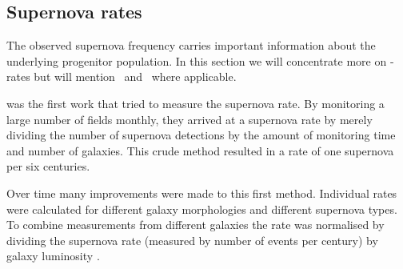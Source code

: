 \subsection{Supernova rates}
\label{sec:sn_rates}
The observed supernova frequency carries important information about the underlying progenitor population. In this section we will concentrate more on \sneia-rates but will mention \sneii\ and \sneibc\ where applicable.

\citet{1938ApJ....88..529Z} was the first work that tried to measure the supernova rate. By monitoring a large number of fields monthly, they arrived at a supernova rate by merely dividing the number of supernova detections by the amount of monitoring time and number of galaxies. This crude method resulted in a rate of one supernova per six centuries. 

Over time many improvements were made to this first method. Individual rates were calculated for different galaxy morphologies and different supernova types. To combine measurements from different galaxies the rate was normalised by dividing the supernova rate (measured by number of events per century) by galaxy luminosity \citep[e.g.][]{1991ARA&A..29..363V,1994ApJS...92..487T}. 

